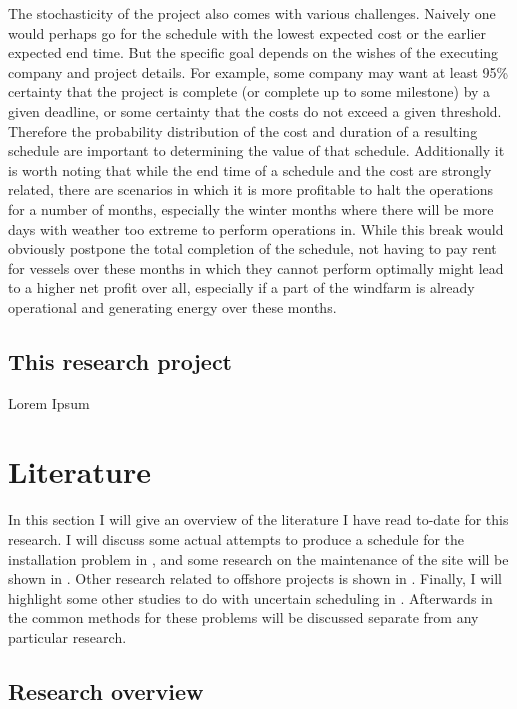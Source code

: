 \documentclass[a4paper,12pt]{article}
\begin{document}
The stochasticity of the project also comes with various challenges. Naively one would perhaps go for the schedule with the lowest expected cost or the earlier expected end time. But the specific goal depends on the wishes of the executing company and project details. For example, some company may want at least 95\% certainty that the project is complete (or complete up to some milestone) by a given deadline, or some certainty that the costs do not exceed a given threshold. Therefore the probability distribution of the cost and duration of a resulting schedule are important to determining the value of that schedule. Additionally it is worth noting that while the end time of a schedule and the cost are strongly related, there are scenarios in which it is more profitable to halt the operations for a number of months, especially the winter months where there will be more days with weather too extreme to perform operations in. While this break would obviously postpone the total completion of the schedule, not having to pay rent for vessels over these months in which they cannot perform optimally might lead to a higher net profit over all, especially if a part of the windfarm is already operational and generating energy over these months. 


\subsection{This research project} \label{ss:thisproj}
Lorem Ipsum

\pagebreak

\section{Literature} \label{s:lit}
In this section I will give an overview of the literature I have read to-date for this research. I will discuss some actual attempts to produce a schedule for the installation problem in , and some research on the maintenance of the site will be shown in . Other research related to offshore projects is shown in . Finally, I will highlight some other studies to do with uncertain scheduling in .  Afterwards in  the common methods for these problems will be discussed separate from any particular research. 

\subsection{Research overview} \label{ss:rese}
\end{document}

